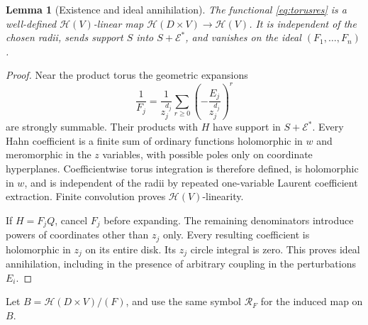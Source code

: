 \documentclass[11pt,letterpaper]{article}
\newtheorem{lemma}[lemma]{Lemma}
\theoremstyle{definition}
\theoremstyle{remark}
\newcommand{\HH}{\mathscr H}
\newcommand{\EE}{\mathcal E}
\numberwithin{equation}{section}
\begin{document}
\begin{lemma}[Existence and ideal annihilation]\label{lem:residue}
The functional \eqref{eq:torusres} is a well-defined $\HH(V)$-linear map $\HH(D\times V)\to\HH(V)$. It is independent of the chosen radii, sends support $S$ into $S+\EE^*$, and vanishes on the ideal $(F_1,\ldots,F_n)$.
\end{lemma}
\begin{proof}
Near the product torus the geometric expansions
\begin{equation}\label{eq:reciprocals}
 \frac{1}{F_j}
 =\frac{1}{z_j^{d_j}}
  \sum_{r\geq0}\left(-\frac{E_j}{z_j^{d_j}}\right)^r
\end{equation}
are strongly summable. Their products with $H$ have support in $S+\EE^*$. Every Hahn coefficient is a finite sum of ordinary functions holomorphic in $w$ and meromorphic in the $z$ variables, with possible poles only on coordinate hyperplanes. Coefficientwise torus integration is therefore defined, is holomorphic in $w$, and is independent of the radii by repeated one-variable Laurent coefficient extraction. Finite convolution proves $\HH(V)$-linearity.

If $H=F_jQ$, cancel $F_j$ before expanding. The remaining denominators introduce powers of coordinates other than $z_j$ only. Every resulting coefficient is holomorphic in $z_j$ on its entire disk. Its $z_j$ circle integral is zero. This proves ideal annihilation, including in the presence of arbitrary coupling in the perturbations $E_i$.
\end{proof}
Let $B=\HH(D\times V)/(F)$, and use the same symbol $\mathcal R_F$ for the induced map on $B$.
\end{document}
